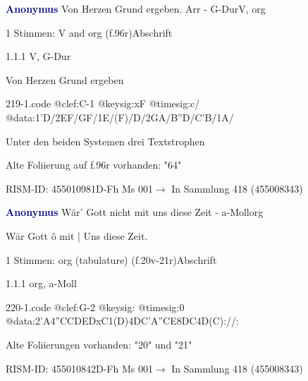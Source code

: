 \documentclass[twocolumn, 12pt]{book}
\begin{document}
\par \vspace{16pt} \textcolor{darkblue}{\textbf{Anonymus  }}\hfillplus{\textbf{[219]}}\newline Von Herzen Grund ergeben. Arr - G-Dur\newline V, org
\par \begin{itshape}\end{itshape} 
\par \textcolor{darkblue}{}  1 Stimmen: V and org  (f.96r)\newline Abschrift
\par 1.1.1  V, G-Dur\newline \begin{footnotesize} Von Herzen Grund ergeben \end{footnotesize}  
\begin{filecontents*}{219-1.code}
@clef:C-1
@keysig:xF
@timesig:c/
@data:1'D/2EF/GF/1E/(F)/D/2GA/B''D/C'B/1A/
\end{filecontents*}
\newline %
\par Unter den beiden Systemen drei Textstrophen
\par Alte Foliierung auf f.96r vorhanden: "64"
\par RISM-ID: 455010981\newline D-Fh  Ms 001\newline $\rightarrow$ In Sammlung 418 (455008343)
      
\par \vspace{16pt} \textcolor{darkblue}{\textbf{Anonymus  }}\hfillplus{\textbf{[220]}}\newline Wär' Gott nicht mit uns diese Zeit - a-Moll\newline org
\par \begin{itshape}[f.20v, at left:] Wär Gott ô mit | Uns diese Zeit.\end{itshape} 
\par \textcolor{darkblue}{}  1 Stimmen: org (tabulature)  (f.20v-21r)\newline Abschrift
\par 1.1.1  org, a-Moll  
\begin{filecontents*}{220-1.code}
@clef:G-2
@keysig:
@timesig:0
@data:2'A4''CCDEDxC1(D)4DC'A''CE{8DC}4D(C)://:
\end{filecontents*}
\newline %
\par Alte Foliierungen vorhanden: "20" und "21"
\par RISM-ID: 455010842\newline D-Fh  Ms 001\newline $\rightarrow$ In Sammlung 418 (455008343)
      
\end{document}
